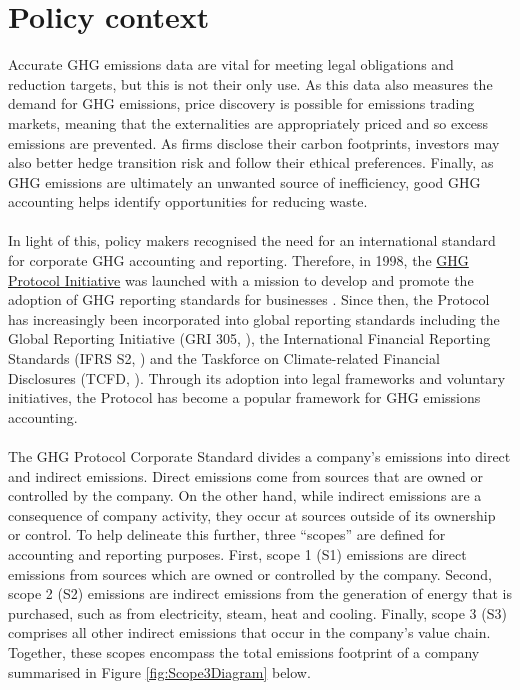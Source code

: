 \documentclass[12pt,twoside]{report}
\begin{document}
\section{Policy context}\label{sec:PolicyContext}
Accurate GHG emissions data are vital for meeting legal obligations and reduction targets, but this is not their only use. As this data also measures the demand for GHG emissions, price discovery is possible for emissions trading markets, meaning that the externalities are appropriately priced and so excess emissions are prevented. As firms disclose their carbon footprints, investors may also better hedge transition risk and follow their ethical preferences. Finally, as GHG emissions are ultimately an unwanted source of inefficiency, good GHG accounting helps identify opportunities for reducing waste. 
\\\\
In light of this, policy makers recognised the need for an international standard for corporate GHG accounting and reporting. Therefore, in 1998, the \href{https://ghgprotocol.org/about-us}{GHG Protocol Initiative} was launched with a mission to develop and promote the adoption of GHG reporting standards for businesses \cite{ghgprotocol2004}. Since then, the Protocol has increasingly been incorporated into global reporting standards including the Global Reporting Initiative (GRI 305, \cite{gri2016}), the International Financial Reporting Standards (IFRS S2, \cite{ifrs2023}) and the Taskforce on Climate-related Financial Disclosures (TCFD, \cite{tcfd2021}). Through its adoption into legal frameworks and voluntary initiatives, the Protocol has become a popular framework for GHG emissions accounting.
\\\\
The GHG Protocol Corporate Standard divides a company's emissions into direct and indirect emissions. Direct emissions come from sources that are owned or controlled by the company. On the other hand, while indirect emissions are a consequence of company activity, they occur at sources outside of its ownership or control. To help delineate this further, three ``scopes'' are defined for accounting and reporting purposes. First,  scope 1 (S1) emissions are direct emissions from sources which are owned or controlled by the company. Second, scope 2 (S2) emissions are indirect emissions from the generation of energy that is purchased, such as from electricity, steam, heat and cooling. Finally, scope 3 (S3) comprises all other indirect emissions that occur in the company's value chain. Together, these scopes encompass the total emissions footprint of a company summarised in Figure \ref{fig:Scope3Diagram} below.
\end{document}
